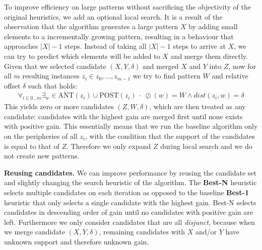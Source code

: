 \documentclass{llncs}
\begin{document}
To improve efficiency on large patterns without sacrificing the objectivity of the original heuristics, we add an optional local search. It is a result of the observation that the algorithm generates a large pattern $X$ by adding small elements to a incrementally growing pattern, resulting in a behaviour that approaches $|X|-1$ steps. Instead of taking all $|X|-1$ steps to arrive at $X$, we can try to predict which elements will be added to $X$ and merge them directly. Given that we selected candidate $(X,Y,\delta)$ and merged $X$ and $Y$ into $Z$, now for all $m$ resulting instances $z_i \in {z_0,\dots,z_{m-1}}$ we try to find pattern $W$ and relative offset $\delta$ such that holds:
\begin{align}
\label{floodfill}
\forall_{i\in 0\dots m} \exists_w \in \mathrm{ANT}(z_i) \cup \mathrm{POST}(z_i) \ \cdot \ \oslash(w) = W \land dist(z_i, w) = \delta 
\end{align}
\noindent This yields zero or more candidates $(Z,W,\delta)$, which are then treated as any candidate: candidates with the highest gain are merged first until none exists with positive gain. This essentially means that we run the baseline algorithm only on the peripheries of all $z_i$, with the condition that the support of the candidates is equal to that of $Z$. Therefore we only expand $Z$ during local search and we do not create new patterns. 



\smallskip \noindent \textbf{Reusing candidates.}  We can improve performance by reusing the candidate set and slightly changing the search heuristic of the algorithm. The \textbf{Best-N} heuristic selects multiple candidates on each iteration as opposed to the baseline \textbf{Best-1} heuristic that only selects a single candidate with the highest gain. Best-N selects candidates in descending order of gain until no candidates with positive gain are left. Furthermore we only consider candidates that are all \emph{disjunct}, because when we merge candidate $(X,Y,\delta)$, remaining candidates with $X$ and/or $Y$ have unknown support and therefore unknown gain.%
\end{document}
